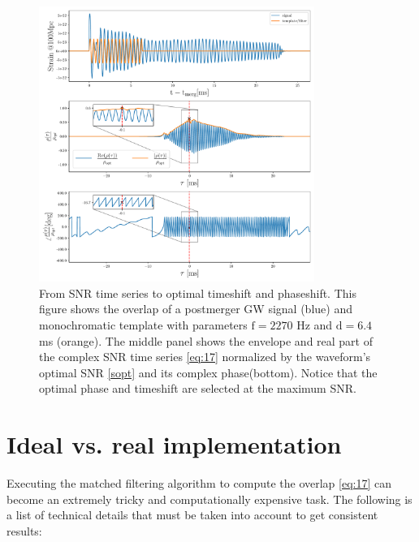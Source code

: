\begin{figure}[hbt!]
\begin{center}
\includegraphics[width=0.8\textwidth, angle=0]{images/Data_analysis/results/ex_search.pdf}
\captionsetup{width=0.8\textwidth}
\caption[From SNR to the optimal timeshift and phaseshift]{From SNR time series to optimal timeshift and phaseshift. This figure shows the overlap of a postmerger GW signal (blue) and monochromatic template with parameters $\mathrm{f=2270}$ Hz and $\mathrm{d=6.4}$ ms (orange). The middle panel shows the envelope and real part of the complex SNR time series \ref{eq:17} normalized by the waveform's optimal SNR \ref{sopt} and its complex phase(bottom). Notice that the optimal phase and timeshift are selected at the maximum SNR.}
\label{fig:7}
\end{center}
\end{figure}

\FloatBarrier



\section{Ideal vs. real implementation}

Executing the matched filtering algorithm to compute the overlap \ref{eq:17} can become an extremely tricky and computationally expensive task. The following is a list of technical details that must be taken into account to get consistent results:

